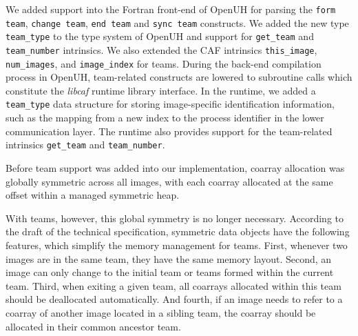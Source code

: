 We added support into the Fortran front-end of OpenUH for parsing the
\texttt{form team},  \texttt{change team}, \texttt{end team} and \texttt{sync
team} constructs. We added the new type \texttt{team\_type} to the type system
of OpenUH and support for \texttt{get\_team} and \texttt{team\_number} intrinsics.
We also extended  the CAF intrinsics \texttt{this\_image},
\texttt{num\_images}, and \texttt{image\_index} for teams.
During the back-end compilation process in OpenUH, team-related constructs are
lowered to subroutine calls which constitute the \textit{libcaf} runtime
library interface. In the runtime, we added a \texttt{team\_type} data structure
for storing image-specific identification information, such as the mapping
from a new index to the process identifier in the lower communication layer.
The runtime also provides support for the team-related intrinsics
\texttt{get\_team} and \texttt{team\_number}.


Before team support was added into our implementation, coarray allocation was
globally symmetric across all images, with each coarray allocated at the same
offset within a managed symmetric heap.

With teams, however, this global symmetry is no longer necessary. According to the
draft of the technical specification, symmetric data objects have the
following features, which simplify the memory management for teams. First,
whenever two images are in the same team, they have the same memory
layout. Second, an image can only change to the initial team or teams formed
within  the current team. Third, when exiting a given team, all coarrays
allocated within this team should be deallocated automatically. And fourth, if
an image needs to refer to a coarray of another image located in a sibling
team, the coarray should be allocated in their common ancestor team.

